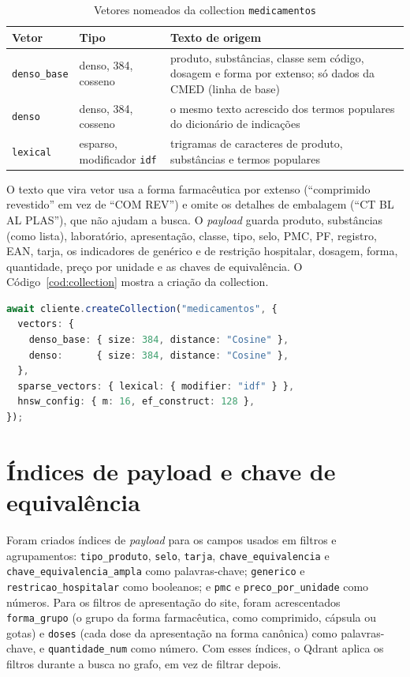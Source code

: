 \documentclass[12pt,oneside,a4paper,english,brazil]{abntex2}
\newcommand{\campo}[1]{\texttt{#1}}
\begin{document}
\begin{table}[htb]
  \centering
  \caption{Vetores nomeados da collection \campo{medicamentos}}
  \label{tab:vetores}
  \footnotesize
  \begin{tabular}{|p{2.3cm}|p{2.6cm}|p{9.0cm}|}
    \hline
    \textbf{Vetor} & \textbf{Tipo} & \textbf{Texto de origem} \\ \hline
    \campo{denso\_base} & denso, 384, cosseno & produto, substâncias, classe sem código, dosagem e forma por extenso; só dados da CMED (linha de base) \\ \hline
    \campo{denso} & denso, 384, cosseno & o mesmo texto acrescido dos termos populares do dicionário de indicações \\ \hline
    \campo{lexical} & esparso, modificador \campo{idf} & trigramas de caracteres de produto, substâncias e termos populares \\ \hline
  \end{tabular}
\end{table}

O texto que vira vetor usa a forma farmacêutica por extenso (``comprimido revestido'' em vez de ``COM REV'') e omite os detalhes de embalagem (``CT BL AL PLAS''), que não ajudam a busca. O \emph{payload} guarda produto, substâncias (como lista), laboratório, apresentação, classe, tipo, selo, PMC, PF, registro, EAN, tarja, os indicadores de genérico e de restrição hospitalar, dosagem, forma, quantidade, preço por unidade e as chaves de equivalência. O Código~\ref{cod:collection} mostra a criação da collection.

\begin{lstlisting}[language=TypeScript, caption={Criação da collection com três vetores nomeados}, label=cod:collection]
await cliente.createCollection("medicamentos", {
  vectors: {
    denso_base: { size: 384, distance: "Cosine" },
    denso:      { size: 384, distance: "Cosine" },
  },
  sparse_vectors: { lexical: { modifier: "idf" } },
  hnsw_config: { m: 16, ef_construct: 128 },
});
\end{lstlisting}

\section{Índices de payload e chave de equivalência}

\begin{sloppypar}
Foram criados índices de \emph{payload} para os campos usados em filtros e agrupamentos: \campo{tipo\_produto}, \campo{selo}, \campo{tarja}, \campo{chave\_equivalencia} e \campo{chave\_equivalencia\_ampla} como palavras-chave; \campo{generico} e \campo{restricao\_hospitalar} como booleanos; e \campo{pmc} e \campo{preco\_por\_unidade} como números. Para os filtros de apresentação do site, foram acrescentados \campo{forma\_grupo} (o grupo da forma farmacêutica, como comprimido, cápsula ou gotas) e \campo{doses} (cada dose da apresentação na forma canônica) como palavras-chave, e \campo{quantidade\_num} como número. Com esses índices, o Qdrant aplica os filtros durante a busca no grafo, em vez de filtrar depois.
\end{sloppypar}
\end{document}
